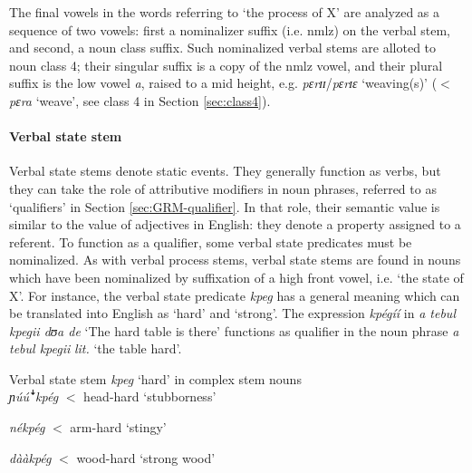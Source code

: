 \begin{exe}
\begin{exe}
\begin{exe}
{\begin{exe}
\begin{exe}
\begin{exe}
\begin{exe}
 The final vowels in the
words referring to `the process of X' are analyzed as a sequence of two
vowels: first a nominalizer suffix (i.e. {\sc nmlz})  on the verbal stem,  and
second,  a noun class suffix.  Such nominalized verbal stems are alloted to
noun class 4;  their singular suffix is a copy of the {\sc nmlz} vowel,
and their  plural suffix is the low vowel {\it a}, raised to a mid height, e.g.
{\it pɛrɪɪ}/{\it pɛrɪɛ} `weaving(s)'  ($<$ {\it pɛra} `weave', see class 4
in Section \ref{sec:class4}).



\paragraph{Verbal state stem}
\label{sec:GRM-verb-state-stem}

Verbal state stems  denote static events. They generally
function  as verbs, but they can take the role of attributive modifiers in
noun phrases, referred to as  `qualifiers' in Section \ref{sec:GRM-qualifier}.
In that role, their semantic value is similar to the value of adjectives in
English: they denote a property  assigned to a referent.  To function as  a
qualifier, some verbal state predicates must be nominalized. As with verbal 
process stems,  verbal state stems are found in nouns which
have
been nominalized by suffixation of a  high front vowel, i.e. `the state of X'.
For instance, the verbal state predicate {\it kpeg} has a general meaning which 
can be
translated into English as `hard' and `strong'. The expression {\it kpégíí} 
in
{\it a tebul kpegii dʊa de} `The hard table is there' functions as qualifier in
the noun phrase {\it a tebul kpegii} {\it lit.} `the table hard'. 


\ea\label{exːGRM-v-sta-p-hard}{\rm Verbal state stem {\it kpeg}  `hard' in
complex stem nouns}\\
 
 \ea\label{exːGRM-v-sta-p-hard-head}
{\it ɲúú{\T ꜜ}kpég} $<$ {\sc head-hard} {\rm `stubborness'} 

 \ex\label{exːGRM-v-sta-p-hard-arm}
{\it nékpég} $<$ {\sc arm-hard} {\rm `stingy'} 

 \ex\label{exːGRM-v-sta-p-hard-tree}
{\it dààkpég} $<$ {\sc wood-hard} {\rm `strong wood'}
 
\z 
 \z
 


\end{exe}
\end{exe}
\end{exe}
\end{exe}}
\end{exe}
\end{exe}
\end{exe}
